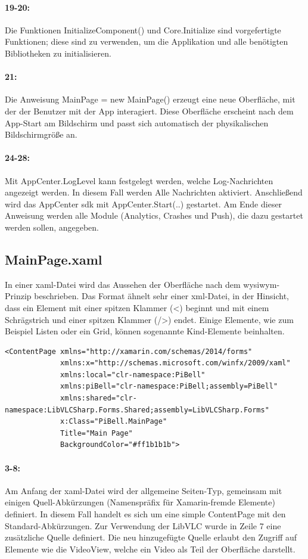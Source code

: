 \paragraph{19-20:} Die Funktionen InitializeComponent() und Core.Initialize sind vorgefertigte Funktionen; diese sind zu verwenden, um die Applikation und alle benötigten Bibliotheken zu initialisieren.
\paragraph{21:} Die Anweisung MainPage = new MainPage() erzeugt eine neue Oberfläche, mit der der Benutzer mit der App interagiert. Diese Oberfläche erscheint nach dem App-Start am Bildschirm und passt sich automatisch der physikalischen Bildschirmgröße an.
\paragraph{24-28:} Mit AppCenter.LogLevel kann festgelegt werden, welche Log-Nachrichten angezeigt werden. In diesem Fall werden Alle Nachrichten aktiviert.
Anschließend wird das AppCenter \acs{sdk} mit AppCenter.Start(..) gestartet. Am Ende dieser Anweisung werden alle Module (Analytics, Crashes und Push), die dazu gestartet werden sollen, angegeben.

\subsection{MainPage.xaml}
In einer \acs{xaml}-Datei wird das Aussehen der Oberfläche nach dem \acs{wysiwym}-Prinzip beschrieben. Das Format ähnelt sehr einer \acs{xml}-Datei, in der Hinsicht, dass ein Element mit einer spitzen Klammer (<) beginnt und mit einem Schrägstrich und einer spitzen Klammer (/>) endet. Einige Elemente, wie zum Beispiel Listen oder ein Grid, können sogenannte Kind-Elemente beinhalten.
\begin{verbatim}
<ContentPage xmlns="http://xamarin.com/schemas/2014/forms"
             xmlns:x="http://schemas.microsoft.com/winfx/2009/xaml"
             xmlns:local="clr-namespace:PiBell"
             xmlns:piBell="clr-namespace:PiBell;assembly=PiBell"
             xmlns:shared="clr-namespace:LibVLCSharp.Forms.Shared;assembly=LibVLCSharp.Forms"
             x:Class="PiBell.MainPage"
             Title="Main Page"
             BackgroundColor="#ff1b1b1b">
\end{verbatim}
\paragraph{3-8:} Am Anfang der \acs{xaml}-Datei wird der allgemeine Seiten-Typ, gemeinsam mit einigen Quell-Abkürzungen (Namenspräfix für Xamarin-fremde Elemente) definiert. In diesem Fall handelt es sich um eine simple ContentPage mit den Standard-Abkürzungen. Zur Verwendung der LibVLC wurde in Zeile 7 eine zusätzliche Quelle definiert. Die neu hinzugefügte Quelle erlaubt den Zugriff auf Elemente wie die VideoView, welche ein Video als Teil der Oberfläche darstellt.
